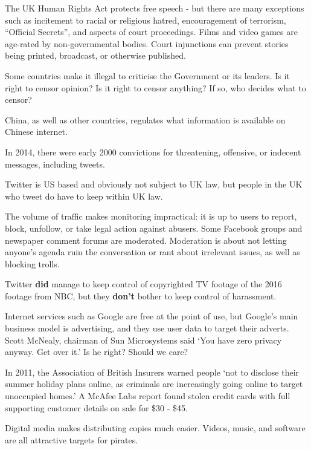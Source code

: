 \documentclass[../main.tex]{subfile}
\begin{document}


The UK Human Rights Act protects free speech - but there are many exceptions such as incitement to racial or religious hatred, encouragement of terrorism, \enquote{Official Secrets}, and aspects of court proceedings. Films and video games are age-rated by non-governmental bodies. Court injunctions can prevent stories being printed, broadcast, or otherwise published.

Some countries make it illegal to criticise the Government or its leaders. Is it right to censor opinion? Is it right to censor anything? If so, who decides what to censor?

China, as well as other countries, regulates what information is available on Chinese internet.

In 2014, there were early 2000 convictions for threatening, offensive, or indecent messages, including tweets.

Twitter is US based and obviously not subject to UK law, but people in the UK who tweet do have to keep within UK law.

The volume of traffic makes monitoring impractical: it is up to users to report, block, unfollow, or take legal action against abusers. Some Facebook groups and newspaper comment forums are moderated. Moderation is about not letting anyone's agenda ruin the conversation or rant about irrelevant issues, as well as blocking trolls.

Twitter \textbf{did} manage to keep control of copyrighted TV footage of the 2016 footage from NBC, but they \textbf{don't} bother to keep control of harassment.


Internet services such as Google are free at the point of use, but Google's main business model is advertising, and they use user data to target their adverts. Scott McNealy, chairman of Sun Microsystems said \enquote*{You have zero privacy anyway. Get over it.} Is he right? Should we care?

In 2011, the Association of British Insurers warned people \enquote*{not to disclose their summer holiday plans online, as criminals are increasingly going online to target unoccupied homes.} A McAfee Labs report found stolen credit cards with full supporting customer details on sale for \$30 - \$45.

Digital media makes distributing copies much easier. Videos, music, and software are all attractive targets for pirates.
\end{document}
